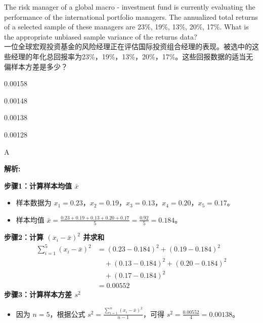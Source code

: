 \documentclass{article}
\newcounter{question} %
\newenvironment{explanation}
{\textbf{解析:}\par}
{\par}
\begin{document}
\begin{question}
    The risk manager of a global macro - investment fund is currently evaluating the performance of the international portfolio managers. The annualized total returns of a selected sample of these managers are 23\%, 19\%, 13\%, 20\%, 17\%. What is the appropriate unbiased sample variance of the returns data?\\
    一位全球宏观投资基金的风险经理正在评估国际投资组合经理的表现。被选中的这些经理的年化总回报率为23\%，19\%，13\%，20\%，17\%。这些回报数据的适当无偏样本方差是多少？
    \end{question}
    
    \begin{choices}
        \item 0.00158
        \item 0.00148
        \item 0.00138
        \item 0.00128
    \end{choices}
    
    \begin{correctanswer}
        A
    \end{correctanswer}
    
    \begin{explanation}
   
    \textbf{步骤1：计算样本均值 \(\bar{x}\)}
    \begin{itemize}
    \item 样本数据为 \(x_1 = 0.23\)，\(x_2=0.19\)，\(x_3 = 0.13\)，\(x_4=0.20\)，\(x_5 = 0.17\)。
    \item 样本均值 \(\bar{x}=\frac{0.23 + 0.19+0.13+0.20+0.17}{5}=\frac{0.92}{5}=0.184\)。
    \end{itemize}
    \textbf{步骤2：计算 \((x_{i}-\bar{x})^{2}\) 并求和}
    \begin{align*}
        \sum_{i=1}^{5} (x_i - \bar{x})^2 &= (0.23 - 0.184)^2 + (0.19 - 0.184)^2 \\
                                          &\quad + (0.13 - 0.184)^2 + (0.20 - 0.184)^2 \\
                                          &\quad + (0.17 - 0.184)^2 \\
                                          &= 0.00552
        \end{align*}
    \textbf{步骤3：计算样本方差 \(s^{2}\)}
    \begin{itemize}
    \item 因为 \(n = 5\)，根据公式 \(s^{2}=\frac{\sum_{i = 1}^{n}(x_{i}-\bar{x})^{2}}{n - 1}\)，可得 \(s^{2}=\frac{0.00552}{4}=0.00138\)。
    \end{itemize}
    \end{explanation}
    
\end{document}

